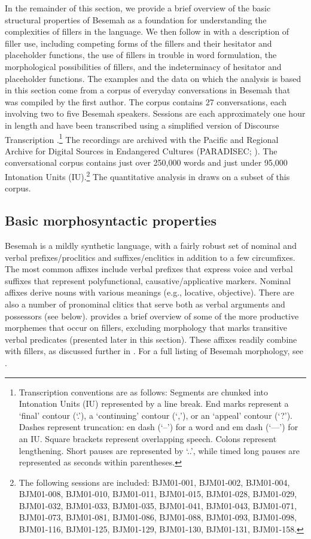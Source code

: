 \documentclass[output=paper,
\ChapterDOI{10.5281/zenodo.15697583}
colorlinks,
citecolor=brown]{langscibook}
\begin{document}
In the remainder of this section, we provide a brief overview of the basic structural properties of Besemah as a foundation for understanding the complexities of fillers in the language. We then follow in  with a description of filler use, including competing forms of the fillers and their hesitator and placeholder functions, the use of fillers in trouble in word formulation, the morphological possibilities of fillers, and the indeterminacy of hesitator and placeholder functions. The examples and the data on which the analysis is based in this section come from a corpus of everyday conversations in Besemah that was compiled by the first author. The corpus contains 27 conversations, each involving two to five Besemah speakers. Sessions are each approximately one hour in length and have been transcribed using a simplified version of Discourse Transcription \citep{dubois1993outline}.\footnote{Transcription conventions are as follows: Segments are chunked into Intonation Units (IU) represented by a line break. End marks represent a `final' contour (`.'), a `continuing' contour (`,'), or an `appeal' contour (`?'). Dashes represent truncation: en dash (`--') for a word and em dash (`---') for an IU. Square brackets represent overlapping speech. Colons represent lengthening. Short pauses are represented by `..', while timed long pauses are represented as seconds within parentheses.} The recordings are archived with the Pacific and Regional Archive for Digital Sources in Endangered Cultures (PARADISEC; \cite{mcdonnell2008besemah}). The conversational corpus contains just over 250,000 words and just under 95,000 Intonation Units (IU).\footnote{The following sessions are included: BJM01-001, BJM01-002, BJM01-004, BJM01-008, BJM01-010, BJM01-011, BJM01-015, BJM01-028, BJM01-029, BJM01-032, BJM01-033, BJM01-035, BJM01-041, BJM01-043, BJM01-071, BJM01-073, BJM01-081, BJM01-086, BJM01-088, BJM01-093, BJM01-098, BJM01-116, BJM01-125, BJM01-129, BJM01-130, BJM01-131, BJM01-158.} The quantitative analysis in  draws on a subset of this corpus.

\subsection{Basic morphosyntactic properties}\label{sec:basic-morphosyntax}
Besemah is a mildly synthetic language, with a fairly robust set of nominal and verbal prefixes/proclitics and suffixes/enclitics in addition to a few circumfixes. The most common affixes include verbal prefixes that express voice and verbal suffixes that represent polyfunctional, causative/applicative markers. Nominal affixes derive nouns with various meanings (e.g., locative, objective). There are also a number of pronominal clitics that serve both as verbal arguments and possessors (see below).  provides a brief overview of some of the more productive morphemes that occur on fillers, excluding morphology that marks transitive verbal predicates (presented later in this section). These affixes readily combine with fillers, as discussed further in . For a full listing of Besemah morphology, see \citet[][36--45]{mcdonnell2016symmetrical}.
\end{document}
